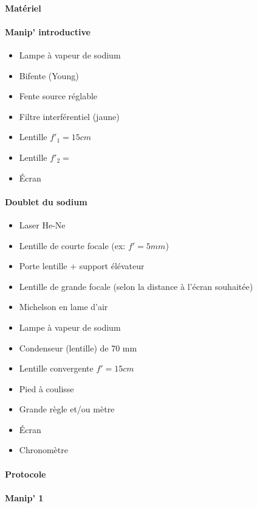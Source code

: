 \documentclass[11pt]{report}
\numberwithin{figure}{section}
\numberwithin{equation}{section}
\numberwithin{table}{section}
\newcommand{\1}{\boldsymbol{1}}
\begin{document}
\begin{tcolorbox}[breakable, enhanced, colback=red!2!white,colframe=mycolor!85!black,title=\textbf{\textbf{Expérience}}]
\paragraph*{Matériel}
\paragraph*{Manip' introductive}
\begin{itemize}
\item Lampe à vapeur de sodium
\item Bifente (Young)
\item Fente source réglable
\item Filtre interférentiel (jaune)
\item Lentille $f'_1 = 15cm$ 
\item Lentille $f'_2 = $
\item Écran
\end{itemize}
\paragraph*{Doublet du sodium}
\begin{itemize}
\item Laser He-Ne
\item Lentille de courte focale (ex: $f' = 5mm$)
\item Porte lentille + support élévateur
\item Lentille de grande focale (selon la distance à l'écran souhaitée)
\item Michelson en lame d'air
\item Lampe à vapeur de sodium
\item Condenseur (lentille) de 70 mm 
\item Lentille convergente $f' = 15cm$
\item Pied à coulisse
\item Grande règle et/ou mètre
\item Écran
\item Chronomètre
\end{itemize}

\paragraph*{Protocole } 

\paragraph*{Manip' 1}


\end{tcolorbox}
\end{document}
